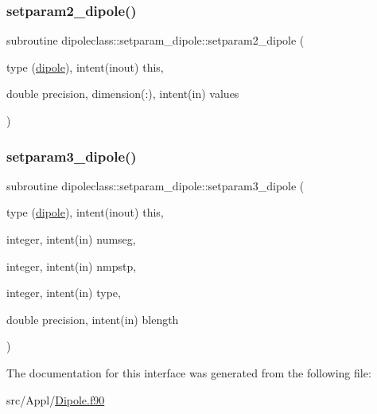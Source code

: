 \mbox{\label{interfacedipoleclass_1_1setparam__dipole_a3f5aee86e405957edcda5168e4954ecb}} 
\subsubsection{\texorpdfstring{setparam2\_dipole()}{setparam2\_dipole()}}
{\footnotesize\ttfamily subroutine dipoleclass\+::setparam\+\_\+dipole\+::setparam2\+\_\+dipole (\begin{DoxyParamCaption}\item[{type (\mbox{\hyperlink{namespacedipoleclass_structdipoleclass_1_1dipole}{dipole}}), intent(inout)}]{this,  }\item[{double precision, dimension(\+:), intent(in)}]{values }\end{DoxyParamCaption})}

\mbox{\label{interfacedipoleclass_1_1setparam__dipole_a0ca4bd9bdf486dc6ac36486c5efeb056}} 
\subsubsection{\texorpdfstring{setparam3\_dipole()}{setparam3\_dipole()}}
{\footnotesize\ttfamily subroutine dipoleclass\+::setparam\+\_\+dipole\+::setparam3\+\_\+dipole (\begin{DoxyParamCaption}\item[{type (\mbox{\hyperlink{namespacedipoleclass_structdipoleclass_1_1dipole}{dipole}}), intent(inout)}]{this,  }\item[{integer, intent(in)}]{numseg,  }\item[{integer, intent(in)}]{nmpstp,  }\item[{integer, intent(in)}]{type,  }\item[{double precision, intent(in)}]{blength }\end{DoxyParamCaption})}



The documentation for this interface was generated from the following file\+:\begin{DoxyCompactItemize}
\item 
src/\+Appl/\mbox{\hyperlink{_dipole_8f90}{Dipole.\+f90}}\end{DoxyCompactItemize}
